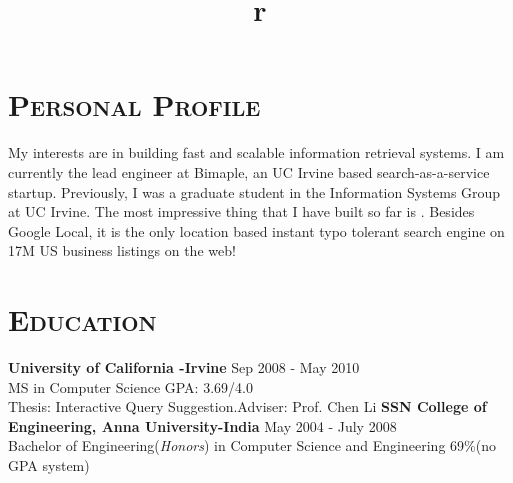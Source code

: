 \begin{resume}

\section{\textsc{Personal \newline Profile}}
My interests are in building fast and scalable information retrieval systems. I am currently the lead engineer at Bimaple, an UC Irvine based search-as-a-service startup. Previously, I was a graduate student in the Information Systems Group at UC Irvine. The most impressive thing that I have built so far is . Besides Google Local, it is the only location based instant typo tolerant search engine on 17M US business listings on the web!  

\section{\textsc{Education}}

\textbf{University of California -Irvine} \hfill Sep 2008 - May 2010 \\
MS in Computer Science \hfill GPA: 3.69/4.0\\
Thesis: Interactive Query Suggestion.\newline Adviser: Prof. Chen Li\newline\newline
\textbf{SSN College of Engineering, Anna University-India} \hfill May 2004 - July 2008 \\ 
Bachelor of Engineering(\textit{Honors}) in Computer Science and Engineering \hfill69\%(no GPA system)\\


\begin{formatb}
  \title{r}\\
  \\
  \body\\
\end{formatb}


\end{resume}
